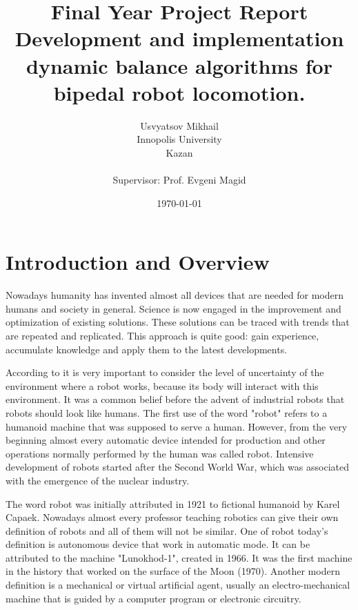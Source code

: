 \documentclass[12pt,a4paper]{report}
\begin{document}
	
	\title{Final Year Project Report\\ Development and implementation dynamic balance algorithms for bipedal robot locomotion.}
	\author{Usvyatsov Mikhail\\Innopolis University\\Kazan\\  ~\\ \normalsize Supervisor: Prof. Evgeni Magid}
	\date{\normalsize \today}
	\maketitle
	
	\tableofcontents
	
	\newpage

	\chapter{Introduction and Overview}
		Nowadays humanity has invented almost all devices that are needed for modern humans and society in general. Science is now engaged in the improvement and optimization of existing solutions. These solutions can be traced with trends that are repeated and replicated. This approach is quite good: gain experience, accumulate knowledge and apply them to the latest developments.
		
		According to \cite{pfeifer2007self} it is very important to consider the level of uncertainty of the environment where a robot works, because its body will interact with this environment. It was a common belief before the advent of industrial robots that robots should look like humans. The first use of the word "robot" refers to a humanoid machine that was supposed to serve a human. However, from the very beginning almost every automatic device intended for production and other operations normally performed by the human was called robot. Intensive development of robots started after the Second World War, which was associated with the emergence of the nuclear industry.
		
		The word robot was initially attributed in 1921 to fictional humanoid by Karel Capaek. Nowadays almost every professor teaching robotics can give their own definition of robots and all of them will not be similar. One of robot today's definition is autonomous device that work in automatic mode. It can be attributed to the machine "Lunokhod-1", created in 1966. It was the first machine in the history that worked on the surface of the Moon (1970). Another modern definition is a mechanical or virtual artificial agent, usually an electro-mechanical machine that is guided by a computer program or electronic circuitry.
		
\end{document}
